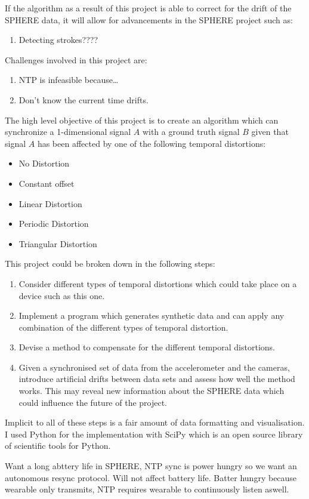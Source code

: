 If the algorithm as a result of this project is able to correct for the drift of the SPHERE data, it will allow for advancements in the SPHERE project such as:
\begin{enumerate}
	\item Detecting strokes????
\end{enumerate}

Challenges involved in this project are:
\begin{enumerate}
	\item NTP is infeasible because\ldots
	\item Don’t know the current time drifts.
\end{enumerate}

The high level objective of this project is to create an algorithm which can synchronize a 1-dimensional signal $A$ with a ground truth signal $B$ given that signal $A$ has been affected by one of the following temporal distortions:
\begin{itemize}
	\item No Distortion
	\item Constant offset
	\item Linear Distortion
	\item Periodic Distortion
	\item Triangular Distortion
\end{itemize}

This project could be broken down in the following steps:
\begin{enumerate}
    \item Consider different types of temporal distortions which could take place on a device such as this one.
    \item Implement a program which generates synthetic data and can apply any combination of the different types of temporal distortion.
    \item Devise a method to compensate for the different temporal distortions.
    \item Given a synchronised set of data from the accelerometer and the cameras, introduce artificial drifts between data sets and assess how well the method works. This may reveal new information about the SPHERE data which could influence the future of the project.
\end{enumerate}

Implicit to all of these steps is a fair amount of data formatting and visualisation. I used Python for the implementation with SciPy which is an open source library of scientific tools for Python.

Want a long abttery life in SPHERE, NTP sync is power hungry so we want an autonomous resync protocol. Will not affect battery life. Batter hungry because wearable only transmits, NTP requires wearable to continuously listen aswell.